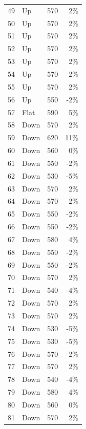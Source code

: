 \documentclass{scrartcl}
\begin{document}
\begin{longtable}{|r|l|r|r|}
		49    & Up    & 570   & 2\%     \\
		50    & Up    & 570   & 2\%     \\
		51    & Up    & 570   & 2\%     \\
		52    & Up    & 570   & 2\%     \\
		53    & Up    & 570   & 2\%     \\
		54    & Up    & 570   & 2\%     \\
		55    & Up    & 570   & 2\%     \\
		56    & Up    & 550   & -2\%    \\
		57    & Flat  & 590   & \cellcolor[rgb]{ 1,  .922,  .612}\textcolor[rgb]{ .612,  .341,  0}{5\%}  \\
		58    & Down  & 570   & 2\%     \\
		59    & Down  & 620   & \cellcolor[rgb]{ 1,  .78,  .808}\textcolor[rgb]{ .612,  0,  .024}{11\%}  \\
		60    & Down  & 560   & 0\%     \\
		61    & Down  & 550   & -2\%    \\
		62    & Down  & 530   & -5\%    \\
		63    & Down  & 570   & 2\%     \\
		64    & Down  & 570   & 2\%     \\
		65    & Down  & 550   & -2\%    \\
		66    & Down  & 550   & -2\%    \\
		67    & Down  & 580   & 4\%     \\
		68    & Down  & 550   & -2\%    \\
		69    & Down  & 550   & -2\%    \\
		70    & Down  & 570   & 2\%     \\
		71    & Down  & 540   & -4\%    \\
		72    & Down  & 570   & 2\%     \\
		73    & Down  & 570   & 2\%     \\
		74    & Down  & 530   & -5\%    \\
		75    & Down  & 530   & -5\%    \\
		76    & Down  & 570   & 2\%     \\
		77    & Down  & 570   & 2\%     \\
		78    & Down  & 540   & -4\%    \\
		79    & Down  & 580   & 4\%     \\
		80    & Down  & 560   & 0\%     \\
		81    & Down  & 570   & 2\%     \\

\end{longtable}
\end{document}
